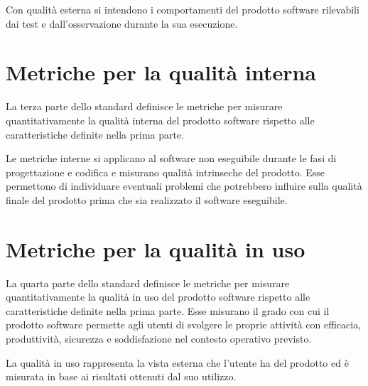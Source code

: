 Con qualità esterna si intendono i comportamenti del prodotto software rilevabili dai test e dall'osservazione durante la sua esecuzione.

\section{Metriche per la qualità interna}
La terza parte dello standard definisce le metriche per misurare quantitativamente la qualità interna del prodotto software rispetto alle caratteristiche definite nella prima parte.

Le metriche interne si applicano al software non eseguibile durante le fasi di progettazione e codifica e misurano qualità intrinseche del prodotto. Esse permettono di individuare eventuali problemi che potrebbero influire sulla qualità finale del prodotto prima che sia realizzato il software eseguibile.

\section{Metriche per la qualità in uso}
La quarta parte dello standard definisce le metriche per misurare quantitativamente la qualità in uso del prodotto software rispetto alle caratteristiche definite nella prima parte. Esse misurano il grado con cui il prodotto software permette agli utenti di svolgere le proprie attività con efficacia, produttività, sicurezza e soddisfazione nel contesto operativo previsto.

La qualità in uso rappresenta la vista esterna che l'utente ha del prodotto ed è misurata in base ai risultati ottenuti dal suo utilizzo.
